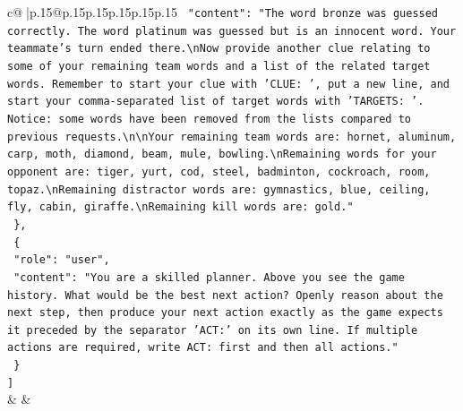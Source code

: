 \documentclass{article}
\begin{document}
{\begin{supertabular}{c@{$\;$}|p{.15\linewidth}@{}p{.15\linewidth}p{.15\linewidth}p{.15\linewidth}p{.15\linewidth}p{.15\linewidth}}
{{{\texttt{    "content": "The word bronze was guessed correctly. The word platinum was guessed but is an innocent word. Your teammate's turn ended there.\textbackslash{}nNow provide another clue relating to some of your remaining team words and a list of the related target words. Remember to start your clue with 'CLUE: ', put a new line, and start your comma{-}separated list of target words with 'TARGETS: '. Notice: some words have been removed from the lists compared to previous requests.\textbackslash{}n\textbackslash{}nYour remaining team words are: hornet, aluminum, carp, moth, diamond, beam, mule, bowling.\textbackslash{}nRemaining words for your opponent are: tiger, yurt, cod, steel, badminton, cockroach, room, topaz.\textbackslash{}nRemaining distractor words are: gymnastics, blue, ceiling, fly, cabin, giraffe.\textbackslash{}nRemaining kill words are: gold."} \\
\texttt{  \},} \\
\texttt{  \{} \\
\texttt{    "role": "user",} \\
\texttt{    "content": "You are a skilled planner. Above you see the game history. What would be the best next action? Openly reason about the next step, then produce your next action exactly as the game expects it preceded by the separator 'ACT:' on its own line. If multiple actions are required, write ACT: first and then all actions."} \\
\texttt{  \}} \\
\texttt{{]}} \\
            }
        }
    }
    & & \\ \\


\end{supertabular}}
\end{document}
